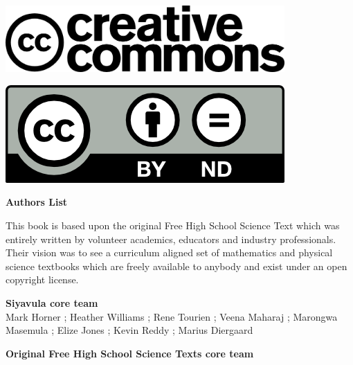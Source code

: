 \vspace*{4in}

\begin{center}
\begin{minipage}{0.6\textwidth}
\includegraphics[width=0.8\textwidth]{title_images/cc2.png}
\end{minipage}
\begin{minipage}{0.3\textwidth}
\includegraphics[width=0.8\textwidth]{title_images/cc1.png}
\end{minipage}
\end{center}







\newpage
\thispagestyle{empty}


\begin{flushleft} \textbf{\huge Authors List} \end{flushleft}

{\LARGE This book is based upon the original Free High School Science Text which was entirely written by
volunteer academics, educators and industry professionals. Their vision was to see a curriculum aligned
set of mathematics and physical science textbooks which are freely available to anybody and exist
under an open copyright license.} \par

\textbf{\LARGE Siyavula core team} \\

Mark Horner ; Heather Williams ; Rene Tourien ; Veena Maharaj ; Marongwa Masemula ; Elize Jones ; Kevin Reddy ; Marius Diergaard \par

\textbf{\LARGE Original Free High School Science Texts core team}\\

